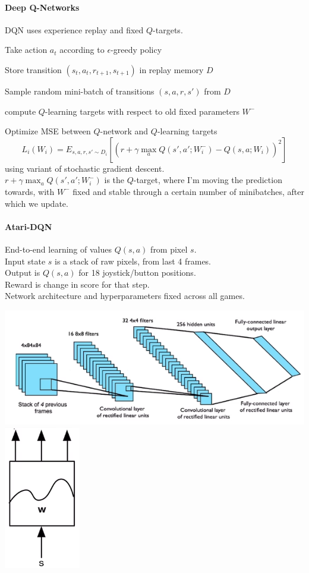 \documentclass[10pt]{report}
\begin{document}
\paragraph{Deep Q-Networks} DQN uses experience replay and fixed $Q$-targets.
\begin{list}{}{}
	\item Take action $a_t$ according to $\epsilon$-greedy policy
	\item Store transition $(s_t,a_t,r_{t+1},s_{t+1})$ in replay memory $D$
	\item Sample random mini-batch of transitions $(s,a,r,s')$ from $D$
	\item compute $Q$-learning targets with respect to old fixed parameters $W^-$
	\item Optimize MSE between $Q$-network and $Q$-learning targets
	$$L_i(W_i) = E_{s,a,r,s'\sim D_i}[(r+\gamma\max_a Q(s',a';W_i^-) - Q(s,a;W_i))^2]$$
	using variant of stochastic gradient descent.\\
	$r+\gamma\max_a Q(s',a';W_i^-)$ is the $Q$-target, where I'm moving the prediction towards, with $W^-$ fixed and stable through a certain number of minibatches, after which we update.
\end{list}
\paragraph{Atari-DQN} End-to-end learning of values $Q(s,a)$ from pixel $s$.\\
Input state $s$ is a stack of raw pixels, from last 4 frames.\\
Output is $Q(s,a)$ for 18 joystick/button positions.\\
Reward is change in score for that step.\\
Network architecture and hyperparameters fixed across all games.
\begin{center}
	\includegraphics[scale=0.5]{179.png}
	\includegraphics[scale=0.5]{180.png}
\end{center}
\end{document}
